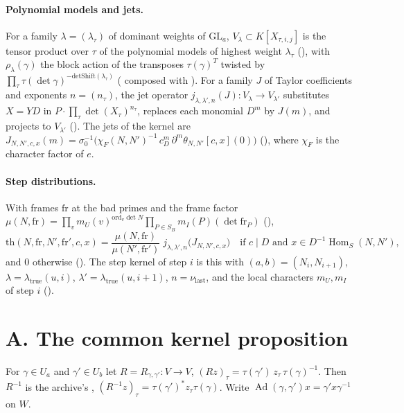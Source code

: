 \documentclass[11pt]{article}
\newcommand{\Ad}{\operatorname{Ad}}
\newcommand{\Hom}{\operatorname{Hom}}
\theoremstyle{definition}
\theoremstyle{remark}
\begin{document}
\paragraph{Polynomial models and jets.} For a family $\lambda=(\lambda_\tau)$ of dominant weights of $\mathrm{GL}_a$, $V_\lambda\subset K[X_{\tau,i,j}]$ is the tensor product over $\tau$ of the polynomial models of highest weight $\lambda_\tau$ (), with $\rho_\lambda(\gamma)$ the block action of the transposes $\tau(\gamma)^{T}$ twisted by $\prod_\tau\tau(\det\gamma)^{-\mathrm{detShift}(\lambda_\tau)}$ ( composed with ). For a family $J$ of Taylor coefficients and exponents $n=(n_\tau)$, the jet operator $j_{\lambda,\lambda',n}(J)\colon V_\lambda\to V_{\lambda'}$ substitutes $X=YD$ in $P\cdot\prod_\tau\det(X_\tau)^{n_\tau}$, replaces each monomial $D^m$ by $J(m)$, and projects to $V_{\lambda'}$ (). The jets of the kernel are $J_{N,N',c,x}(m)=\sigma_0^{-1}\bigl(\chi_F(N,N')^{-1}\,c_D^m\,\partial^m\theta_{N,N'}[c,x](0)\bigr)$ (), where $\chi_F$ is the character factor of $e$.

\paragraph{Step distributions.} With frames $\mathrm{fr}$ at the bad primes and the frame factor $\mu(N,\mathrm{fr})=\prod_{v}m_U(v)^{\mathrm{ord}_v\det N}\prod_{P\in S_B}m_I(P)(\det\mathrm{fr}_P)$ (),
\[
\mathrm{th}(N,\mathrm{fr},N',\mathrm{fr}',c,x)=\frac{\mu(N,\mathrm{fr})}{\mu(N',\mathrm{fr}')}\;j_{\lambda,\lambda',n}\bigl(J_{N,N',c,x}\bigr)\quad\text{if }c\mid D\text{ and }x\in D^{-1}\Hom_S(N,N'),
\]
and $0$ otherwise (). The step kernel of step $i$ is this with $(a,b)=(N_i,N_{i+1})$, $\lambda=\lambda_{\mathrm{true}}(u,i)$, $\lambda'=\lambda_{\mathrm{true}}(u,i+1)$, $n=\nu_{\mathrm{last}}$, and the local characters $m_U,m_I$ of step $i$ ().

\section{A. The common kernel proposition}\label{sec:A}

For $\gamma\in U_a$ and $\gamma'\in U_b$ let $R=R_{\gamma,\gamma'}\colon V\to V$, $(Rz)_\tau=\tau(\gamma')\,z_\tau\,\tau(\gamma)^{-1}$. Then $R^{-1}$ is the archive's , $(R^{-1}z)_\tau=\tau(\gamma')^*z_\tau\tau(\gamma)$. Write $\Ad(\gamma,\gamma')x=\gamma'x\gamma^{-1}$ on $W$.
\end{document}
